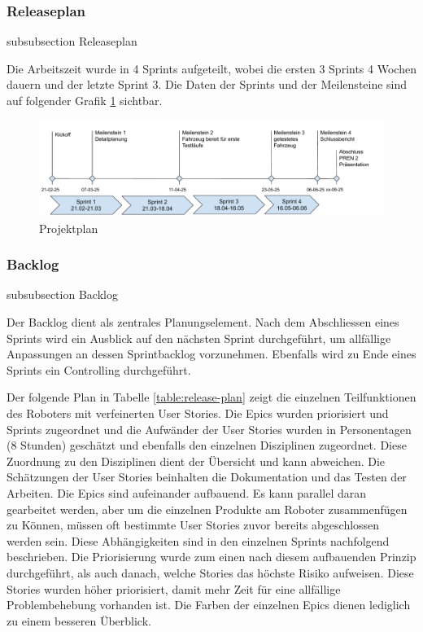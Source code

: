 \subsubsection*{Releaseplan}
    {subsubsection}
    {Releaseplan}

Die Arbeitszeit wurde in 4 Sprints aufgeteilt, wobei die ersten 3 Sprints 4 Wochen dauern und der letzte Sprint 3. Die Daten der Sprints und der Meilensteine sind auf folgender Grafik \ref{fig:project-plan} sichtbar.


\begin{figure}[H]
\centering
\includegraphics[width=\textwidth]{assets/projektmanagement/projektplan.pdf}
\caption{Projektplan}
\label{fig:project-plan}
\end{figure}

\subsubsection*{Backlog}
    {subsubsection}
    {Backlog}
    
Der Backlog dient als zentrales Planungselement.
Nach dem Abschliessen eines Sprints wird ein Ausblick auf den nächsten Sprint durchgeführt, um allfällige Anpassungen an dessen Sprintbacklog vorzunehmen. Ebenfalls wird zu Ende eines Sprints ein Controlling durchgeführt.

Der folgende Plan in Tabelle \ref{table:release-plan} zeigt die einzelnen Teilfunktionen des Roboters mit verfeinerten User Stories. Die Epics wurden priorisiert und Sprints zugeordnet und die Aufwänder der User Stories wurden in Personentagen (8 Stunden) geschätzt und ebenfalls den einzelnen Disziplinen zugeordnet. Diese Zuordnung zu den Disziplinen dient der Übersicht und kann abweichen.
Die Schätzungen der User Stories beinhalten die Dokumentation und das Testen der Arbeiten. Die Epics sind aufeinander aufbauend. Es kann parallel daran gearbeitet werden, aber um die einzelnen Produkte am Roboter zusammenfügen zu Können, müssen oft bestimmte User Stories zuvor bereits abgeschlossen werden sein. Diese Abhängigkeiten sind in den einzelnen Sprints nachfolgend beschrieben. Die Priorisierung wurde zum einen nach diesem aufbauenden Prinzip durchgeführt, als auch danach, welche Stories das höchste Risiko aufweisen. Diese Stories wurden höher priorisiert, damit mehr Zeit für eine allfällige Problembehebung vorhanden ist.
Die Farben der einzelnen Epics dienen lediglich zu einem besseren Überblick.

